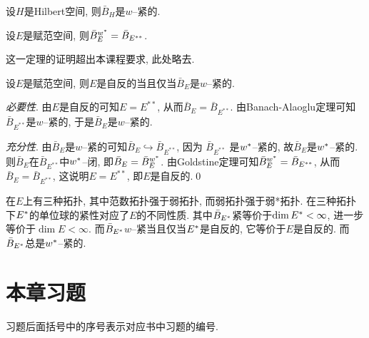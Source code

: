	\begin{Corollary}
	设$ H $是Hilbert空间, 则$ \bar{B}_H $是$ w $--紧的.
	\end{Corollary}
	
	\begin{Theorem}[Goldstine]
	设$ E $是赋范空间, 则$ \bar{B}_E^{w^{*}}=\bar{B}_{E^{**}} $.
	\end{Theorem}
	
	这一定理的证明超出本课程要求, 此处略去.
	
	\begin{Corollary}[Banach]
	设$ E $是赋范空间, 则$ E $是自反的当且仅当$ \bar{B}_E $是$ w $--紧的.
	\end{Corollary}
	\begin{Proof}
	\textsl{必要性}. 由$ E $是自反的可知$ E=E^{**} $, 从而$ \bar{B}_E=\bar{B}_{E^{**}} $. 由Banach-Alaoglu定理可知$ \bar{B}_{E^{**}} $是$ w $--紧的, 于是$ \bar{B}_E $是$ w $--紧的.
	
	\textsl{充分性}. 由$ \bar{B}_E $是$ w $--紧的可知$ \bar{B}_E\hookrightarrow\bar{B}_{E^{**}} $, 因为 $ \bar{B}_{E^{**}} $ 是$ w^{*} $--紧的, 故$ \bar{B}_E $是$ w^{*} $--紧的. 则$ \bar{B}_E $在$ \bar{B}_{E^{**}} $中$ w^{*} $--闭, 即$ \bar{B}_E=\bar{B}_E^{w^{*}} $. 由Goldstine定理可知$ \bar{B}_E^{w^{*}}=\bar{B}_{E^{**}} $, 从而$ \bar{B}_E=\bar{B}_{E^{**}} $, 这说明$ E=E^{**} $, 即$ E $是自反的.\qed
	\end{Proof}
	
	\begin{Remark}
	在$ E $上有三种拓扑, 其中范数拓扑强于弱拓扑, 而弱拓扑强于弱*拓扑. 在三种拓扑下$ E^{*} $的单位球的紧性对应了$ E $的不同性质. 其中$ \bar{B}_{E^{*}} $紧等价于$ \dim E^{*}<\infty $, 进一步等价于$ \dim E<\infty $. 而$ \bar{B}_{E^{*}} $$ w $--紧当且仅当$ E^{*} $是自反的, 它等价于$ E $是自反的. 而$ \bar{B}_{E^{*}} $总是$ w^{*} $--紧的.
	\end{Remark}
	
\section*{本章习题}
	
	习题后面括号中的序号表示对应书中习题的编号.
	
